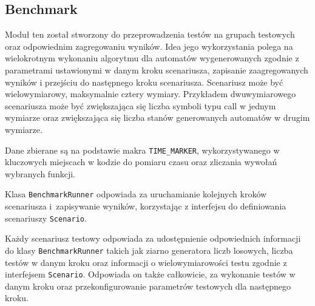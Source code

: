 \subsection{Benchmark}
\label{chap:bench}

Moduł ten został stworzony do przeprowadzenia testów na grupach testowych oraz odpowiednim zagregowaniu wyników.
Idea jego wykorzystania polega na wielokrotnym wykonaniu algorytmu dla automatów wygenerowanych zgodnie z parametrami ustawionymi w danym kroku scenariusza,
zapisanie zaagregowanych wyników i przejściu do następnego kroku scenariusza. Scenariusz może być wielowymiarowy, maksymalnie cztery wymiary. Przykładem dwuwymiarowego
scenariusza może być zwiększająca się liczba symboli typu call w jednym wymiarze oraz zwiększająca się liczba stanów generowanych automatów w drugim wymiarze.

Dane zbierane są na podstawie makra \texttt{TIME\_MARKER}, wykorzystywanego w kluczowych miejscach w kodzie do pomiaru czasu oraz zliczania wywołań wybranych funkcji.

Klasa \texttt{BenchmarkRunner} odpowiada za uruchamianie kolejnych kroków scenariusza i~zapisywanie wyników, korzystając z interfejsu do definiowania scenariuszy
\texttt{Scenario}.

Każdy scenariusz testowy odpowiada za udostępnienie odpowiednich informacji do klasy \texttt{BenchmarkRunner} takich jak ziarno generatora liczb losowych,
liczba testów w danym kroku oraz informacji o wielowymiarowości testu zgodnie z interfejsem \texttt{Scenario}. Odpowiada on także całkowicie, za wykonanie testów
w danym kroku oraz przekonfigurowanie parametrów testowych dla następnego kroku.
